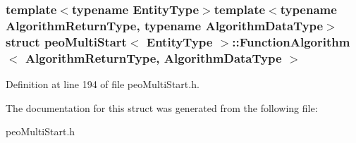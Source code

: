 \subsubsection*{template$<$typename Entity\-Type$>$template$<$typename Algorithm\-Return\-Type, typename Algorithm\-Data\-Type$>$ struct peo\-Multi\-Start$<$ Entity\-Type $>$::Function\-Algorithm$<$ Algorithm\-Return\-Type, Algorithm\-Data\-Type $>$}





Definition at line 194 of file peo\-Multi\-Start.h.

The documentation for this struct was generated from the following file:\begin{CompactItemize}
\item 
peo\-Multi\-Start.h\end{CompactItemize}
